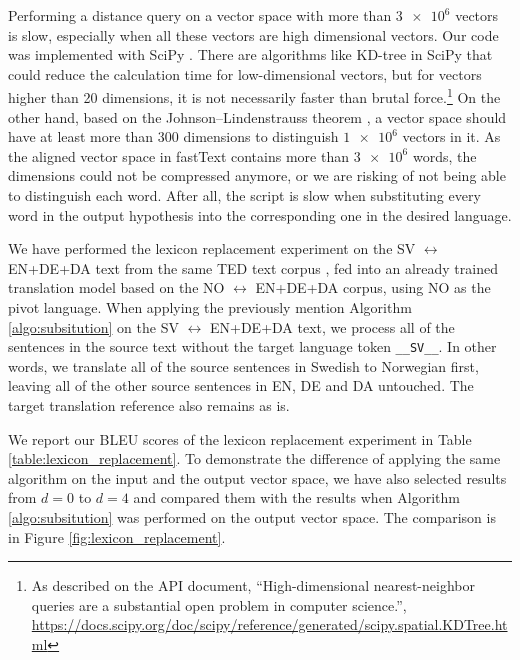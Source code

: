 \documentclass[thesis,fonts=libertine]{cluu}
\begin{document}
Performing a distance query on a vector space with more than $\num{3e6}$ vectors is slow, especially when all these vectors are high dimensional vectors. Our code was implemented with SciPy \parencite{Virtanen:2019aa}. There are algorithms like KD-tree \parencite{Maneewongvatana:aa} in SciPy that could reduce the calculation time for low-dimensional vectors, but for vectors higher than 20 dimensions, it is not necessarily faster than brutal force.\footnote{As described on the API document, ``High-dimensional nearest-neighbor queries are a substantial open problem in computer science.'', \url{https://docs.scipy.org/doc/scipy/reference/generated/scipy.spatial.KDTree.html}} On the other hand, based on the Johnson–Lindenstrauss theorem \parencite{johnson1984extensions}, a vector space should have at least more than 300 dimensions to distinguish $\num{1e6}$ vectors in it. As the aligned vector space in fastText contains more than $\num{3e6}$ words, the dimensions could not be compressed anymore, or we are risking of not being able to distinguish each word. After all, the script is slow when substituting every word in the output hypothesis into the corresponding one in the desired language.

We have performed the lexicon replacement experiment on the SV $\leftrightarrow$ EN+DE+DA text from the same TED text corpus \parencite{Qi:2018aa}, fed into an already trained translation model based on the NO $\leftrightarrow$ EN+DE+DA corpus, using NO as the pivot language. When applying the previously mention Algorithm \ref{algo:subsitution} on the SV $\leftrightarrow$ EN+DE+DA text, we process all of the sentences in the source text without the target language token \verb|__SV__|. In other words, we translate all of the source sentences in Swedish to Norwegian first, leaving all of the other source sentences in EN, DE and DA untouched. The target translation reference also remains as is. 

We report our BLEU scores of the lexicon replacement experiment in Table \ref{table:lexicon_replacement}. To demonstrate the difference of applying the same algorithm on the input and the output vector space, we have also selected results from $d=0$ to $d=4$ and compared them with the results when Algorithm \ref{algo:subsitution} was performed on the output vector space. The comparison is in Figure \ref{fig:lexicon_replacement}.
\end{document}
